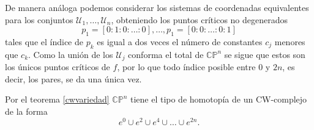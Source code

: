 De manera análoga podemos considerar los sistemas de coordenadas equivalentes para los conjuntos $\mathcal{U}_1, \dots, \mathcal{U}_n$, obteniendo los puntos críticos no degenerados
\begin{equation*}
    p_1 = [0:1:0:\dots:0], \dots, p_1 = [0:0:\dots:0:1]
\end{equation*}
tales que el índice de $p_k$ es igual a dos veces el número de constantes $c_j$ menores que $c_k$. Como la unión de los $\mathcal{U}_j$ conforma el total de $\mathbb{CP}^n$ se sigue que estos son los únicos puntos críticos de $f$, por lo que todo índice posible entre $0$ y $2n$, es decir, los pares, se da una única vez.

Por el teorema \ref{cwvariedad} $\mathbb{CP}^n$ tiene el tipo de homotopía de un CW-complejo de la forma
\begin{equation*}
    e^0\cup e^2 \cup e^4 \cup \dots \cup e^{2n}.
\end{equation*}
